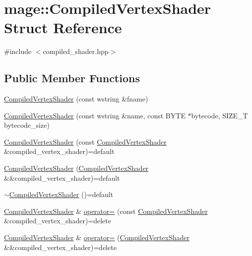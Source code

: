 \hypertarget{structmage_1_1_compiled_vertex_shader}{}\section{mage\+:\+:Compiled\+Vertex\+Shader Struct Reference}
\label{structmage_1_1_compiled_vertex_shader}


{\ttfamily \#include $<$compiled\+\_\+shader.\+hpp$>$}

\subsection*{Public Member Functions}
\begin{DoxyCompactItemize}
\item 
\hyperlink{structmage_1_1_compiled_vertex_shader_a6d7c45d00130a68ee11beb1840d2756e}{Compiled\+Vertex\+Shader} (const wstring \&fname)
\item 
\hyperlink{structmage_1_1_compiled_vertex_shader_abb08e4d5269937f0d9741ac0f748896f}{Compiled\+Vertex\+Shader} (const wstring \&name, const B\+Y\+TE $\ast$bytecode, S\+I\+Z\+E\+\_\+T bytecode\+\_\+size)
\item 
\hyperlink{structmage_1_1_compiled_vertex_shader_a7f8f7294f285ae5fdaf9726939c0b2e3}{Compiled\+Vertex\+Shader} (const \hyperlink{structmage_1_1_compiled_vertex_shader}{Compiled\+Vertex\+Shader} \&compiled\+\_\+vertex\+\_\+shader)=default
\item 
\hyperlink{structmage_1_1_compiled_vertex_shader_a9101da0cf1f08e55d33bfadda3e98f94}{Compiled\+Vertex\+Shader} (\hyperlink{structmage_1_1_compiled_vertex_shader}{Compiled\+Vertex\+Shader} \&\&compiled\+\_\+vertex\+\_\+shader)=default
\item 
\hyperlink{structmage_1_1_compiled_vertex_shader_af909e9e38ec2eef93a77aeac993e4755}{$\sim$\+Compiled\+Vertex\+Shader} ()=default
\item 
\hyperlink{structmage_1_1_compiled_vertex_shader}{Compiled\+Vertex\+Shader} \& \hyperlink{structmage_1_1_compiled_vertex_shader_a9ce8c846d9c29ffd67a19cffd362b709}{operator=} (const \hyperlink{structmage_1_1_compiled_vertex_shader}{Compiled\+Vertex\+Shader} \&compiled\+\_\+vertex\+\_\+shader)=delete
\item 
\hyperlink{structmage_1_1_compiled_vertex_shader}{Compiled\+Vertex\+Shader} \& \hyperlink{structmage_1_1_compiled_vertex_shader_ae42ff3528b8a4b58c3d9f085d0d4573e}{operator=} (\hyperlink{structmage_1_1_compiled_vertex_shader}{Compiled\+Vertex\+Shader} \&\&compiled\+\_\+vertex\+\_\+shader)=delete
\end{DoxyCompactItemize}
